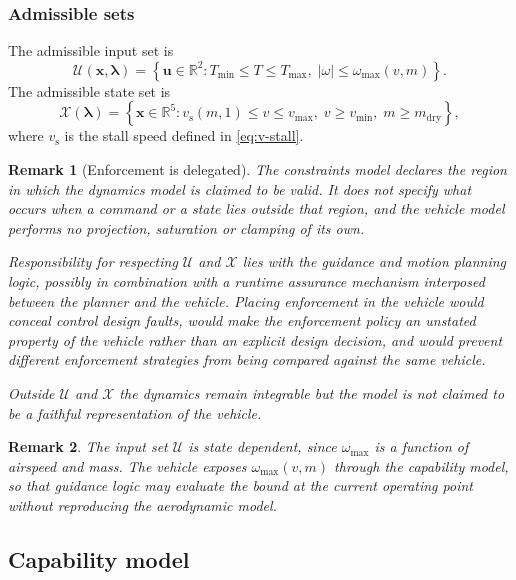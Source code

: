 \documentclass[11pt,a4paper]{article}
\newtheorem{remark}{Remark}
\newcommand{\R}{\mathbb{R}}
\newcommand{\Xset}{\mathcal{X}}
\newcommand{\Uset}{\mathcal{U}}
\newcommand{\vecx}{\bm{x}}
\newcommand{\vecu}{\bm{u}}
\newcommand{\veclambda}{\bm{\lambda}}
\begin{document}
\subsubsection{Admissible sets}

The admissible input set is
\begin{equation}
  \Uset(\vecx, \veclambda) = \left\{
    \vecu \in \R^{2} : T_{\min} \le T \le T_{\max},\;
    |\omega| \le \omega_{\max}(v, m)
  \right\}.
  \label{eq:U}
\end{equation}
The admissible state set is
\begin{equation}
  \Xset(\veclambda) = \left\{
    \vecx \in \R^{5} : v_{\mathrm{s}}(m,1) \le v \le v_{\max},\;
    v \ge v_{\min},\; m \ge m_{\mathrm{dry}}
  \right\},
  \label{eq:X}
\end{equation}
where $v_{\mathrm{s}}$ is the stall speed defined in \cref{eq:v-stall}.

\begin{remark}[Enforcement is delegated]
\label{rem:enforcement}
The constraints model \emph{declares} the region in which the dynamics model is
claimed to be valid. It does not specify what occurs when a command or a state
lies outside that region, and the vehicle model performs no projection,
saturation or clamping of its own.

Responsibility for respecting $\Uset$ and $\Xset$ lies with the guidance and
motion planning logic, possibly in combination with a runtime assurance
mechanism interposed between the planner and the vehicle. Placing enforcement in
the vehicle would conceal control design faults, would make the enforcement
policy an unstated property of the vehicle rather than an explicit design
decision, and would prevent different enforcement strategies from being compared
against the same vehicle.

Outside $\Uset$ and $\Xset$ the dynamics remain integrable but the model is not
claimed to be a faithful representation of the vehicle.
\end{remark}

\begin{remark}
The input set $\Uset$ is state dependent, since $\omega_{\max}$ is a function of
airspeed and mass. The vehicle exposes $\omega_{\max}(v,m)$ through the
capability model, so that guidance logic may evaluate the bound at the current
operating point without reproducing the aerodynamic model.
\end{remark}

\subsection{Capability model}
\end{document}
